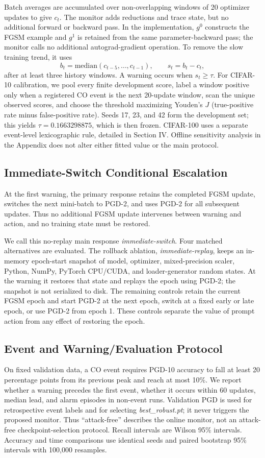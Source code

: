 Batch averages are accumulated over non-overlapping windows of 20 optimizer
updates to give $c_t$. The monitor adds reductions and trace state, but no
additional forward or backward pass. In the implementation, $g^0$ constructs
the FGSM example and $g^1$ is retained from the same parameter-backward pass;
the monitor calls no additional autograd-gradient operation.
To remove the slow training trend, it uses
\begin{equation}
b_t=\mathrm{median}(c_{t-5},\ldots,c_{t-1}),\qquad s_t=b_t-c_t,
\end{equation}
after at least three history windows. A warning occurs when $s_t\geq\tau$.
For CIFAR-10 calibration, we pool every finite development score, label a
window positive only when a registered CO event is the next 20-update window,
scan the unique observed scores, and choose the threshold maximizing Youden's
$J$ (true-positive rate minus false-positive rate). Seeds 17, 23, and 42 form
the development set; this yields $\tau=0.1663298875$, which is then frozen.
CIFAR-100 uses a separate event-level lexicographic rule, detailed
in Section IV. Offline sensitivity analysis in the Appendix does not alter
either fitted value or the main protocol.

\subsection{Immediate-Switch Conditional Escalation}
At the first warning, the primary response retains the completed FGSM update,
switches the next mini-batch to PGD-2, and uses PGD-2 for all subsequent
updates. Thus no additional FGSM update intervenes between warning and action,
and no training state must be restored.

We call this no-replay main response \emph{immediate-switch}. Four matched
alternatives are evaluated. The rollback ablation, \emph{immediate-replay},
keeps an in-memory epoch-start snapshot of model, optimizer, mixed-precision
scaler, Python, NumPy, PyTorch CPU/CUDA, and loader-generator random states.
At the warning it restores that state and replays the epoch using PGD-2; the
snapshot is not serialized to disk. The remaining controls retain the current
FGSM epoch and start PGD-2 at the next epoch, switch at a fixed early or late
epoch, or use PGD-2 from epoch 1. These controls separate the value of prompt
action from any effect of restoring the epoch.

\subsection{Event and Warning/Evaluation Protocol}
On fixed validation data, a CO event requires PGD-10 accuracy to fall at least
20 percentage points from its previous peak and reach at most 10\%. We report
whether a warning precedes the first event, whether it occurs within 60
updates, median lead, and alarm episodes in non-event runs. Validation PGD is
used for retrospective event labels and for selecting \emph{best\_robust.pt};
it never triggers the proposed monitor. Thus ``attack-free'' describes the
online monitor, not an attack-free checkpoint-selection protocol. Recall
intervals are Wilson 95\% intervals. Accuracy and time comparisons use
identical seeds and paired bootstrap 95\% intervals with 100,000 resamples.
